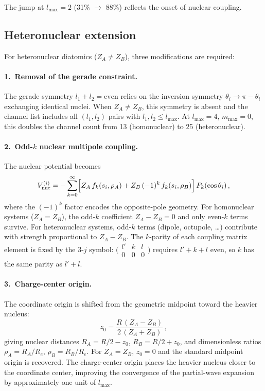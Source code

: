 \documentclass[aps,pra,twocolumn,superscriptaddress,longbibliography]{revtex4-2}
\begin{document}
The jump at $l_{\max} = 2$ (31\% $\to$ 88\%) reflects the onset of
nuclear coupling.

\subsection{Heteronuclear extension}
\label{sec:heteronuclear}

For heteronuclear diatomics ($Z_A \ne Z_B$), three modifications are
required:

\paragraph{1.\ Removal of the gerade constraint.}
The gerade symmetry $l_1 + l_2 = \text{even}$ relies on the
inversion symmetry $\theta_i \to \pi - \theta_i$ exchanging
identical nuclei.  When $Z_A \ne Z_B$, this symmetry is absent
and the channel list includes all $(l_1, l_2)$ pairs with
$l_1, l_2 \le l_{\max}$.  At $l_{\max} = 4$, $m_{\max} = 0$,
this doubles the channel count from 13 (homonuclear) to 25
(heteronuclear).

\paragraph{2.\ Odd-$k$ nuclear multipole coupling.}
The nuclear potential becomes
\begin{equation}
  V_{\rm nuc}^{(i)} = -\sum_{k=0}^{\infty}
    \Bigl[Z_A\,f_k(s_i,\rho_A)
    + Z_B\,(-1)^k\,f_k(s_i,\rho_B)\Bigr]\,P_k(\cos\theta_i)\,,
  \label{eq:Vnuc_hetero}
\end{equation}
where the $(-1)^k$ factor encodes the opposite-pole geometry.
For homonuclear systems ($Z_A = Z_B$), the odd-$k$ coefficient
$Z_A - Z_B = 0$ and only even-$k$ terms survive.  For
heteronuclear systems, odd-$k$ terms (dipole, octupole, \ldots)
contribute with strength proportional to $Z_A - Z_B$.
The $k$-parity of each coupling matrix element is fixed by
the 3-$j$ symbol: $\bigl(\begin{smallmatrix} l' & k & l \\
0 & 0 & 0 \end{smallmatrix}\bigr)$ requires $l' + k + l$ even,
so $k$ has the same parity as $l' + l$.

\paragraph{3.\ Charge-center origin.}
The coordinate origin is shifted from the geometric midpoint
toward the heavier nucleus:
\begin{equation}
  z_0 = \frac{R\,(Z_A - Z_B)}{2\,(Z_A + Z_B)}\,,
  \label{eq:charge_center}
\end{equation}
giving nuclear distances $R_A = R/2 - z_0$, $R_B = R/2 + z_0$,
and dimensionless ratios $\rho_A = R_A / R_e$,
$\rho_B = R_B / R_e$.  For $Z_A = Z_B$, $z_0 = 0$ and the
standard midpoint origin is recovered.  The charge-center origin
places the heavier nucleus closer to the coordinate center,
improving the convergence of the partial-wave expansion by
approximately one unit of $l_{\max}$.
\end{document}
